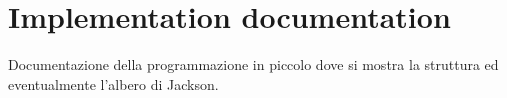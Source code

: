 \chapter{Implementation documentation}
\label{appB}

\noindent Documentazione della programmazione in piccolo dove si mostra la struttura ed eventualmente l'albero di Jackson.